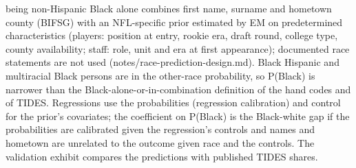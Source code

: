{being non-Hispanic Black alone combines first name, surname and hometown county (BIFSG) with an NFL-specific prior estimated by EM on predetermined characteristics (players: position at entry, rookie era, draft round, college type, county availability; staff: role, unit and era at first appearance); documented race statements are not used (notes/race-prediction-design.md). Black Hispanic and multiracial Black persons are in the other-race probability, so P(Black) is narrower than the Black-alone-or-in-combination definition of the hand codes and of TIDES. Regressions use the probabilities (regression calibration) and control for the prior's covariates; the coefficient on P(Black) is the Black-white gap if the probabilities are calibrated given the regression's controls and names and hometown are unrelated to the outcome given race and the controls. The validation exhibit compares the predictions with published TIDES shares.
\par}

